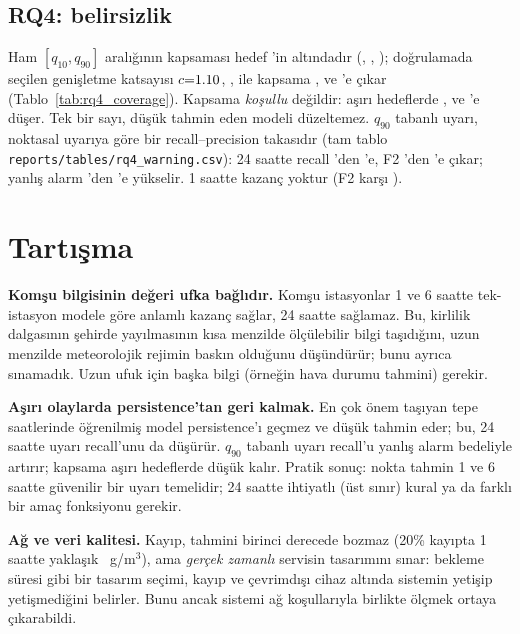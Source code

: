 \documentclass[conference]{IEEEtran}
\newcommand{\widetable}[1]{%
  \begingroup
  \renewenvironment{table}[1][]{\begin{table}[##1]}{\end{table}}%
  \endgroup}
\newcommand{\ugm}{\textmu g/m$^3$}
\begin{document}
\subsection{RQ4: belirsizlik}
Ham $[q_{10},q_{90}]$ aralığının kapsaması hedef \nTargetCoverage{}'in altındadır (\nCovRawHOne{}, \nCovRawHSix{}, \nCovRawHTwentyFour{}); doğrulamada seçilen genişletme katsayısı $c{=}1.10{}$, \nFactorHSix{}, \nFactorHTwentyFour{} ile kapsama \nCovCalHOne{}, \nCovCalHSix{} ve \nCovCalHTwentyFour{}'e çıkar (Tablo~\ref{tab:rq4_coverage}). Kapsama \emph{koşullu} değildir: aşırı hedeflerde \nCovExtCalHOne{}, \nCovExtCalHSix{} ve \nCovExtCalHTwentyFour{}'e düşer. Tek bir sayı, düşük tahmin eden modeli düzeltemez. $q_{90}$ tabanlı uyarı, noktasal uyarıya göre bir recall--precision takasıdır (tam tablo \texttt{reports/tables/rq4\_warning.csv}): 24 saatte recall \nQwRecMtwobHTwentyFour{}'den \nQwRecQnineHTwentyFour{}'e, F2 \nQwFtwoMtwobHTwentyFour{}'den \nQwFtwoQnineHTwentyFour{}'e çıkar; yanlış alarm \nQwFaMtwobHTwentyFour{}'den \nQwFaQnineHTwentyFour{}'e yükselir. 1 saatte kazanç yoktur (F2 \nQwFtwoQnineHOne{} karşı \nQwFtwoMtwobHOne{}).

\widetable{rq4_coverage}

\section{Tartışma}
\textbf{Komşu bilgisinin değeri ufka bağlıdır.} Komşu istasyonlar 1 ve 6 saatte tek-istasyon modele göre anlamlı kazanç sağlar, 24 saatte sağlamaz. Bu, kirlilik dalgasının şehirde yayılmasının kısa menzilde ölçülebilir bilgi taşıdığını, uzun menzilde meteorolojik rejimin baskın olduğunu düşündürür; bunu ayrıca sınamadık. Uzun ufuk için başka bilgi (örneğin hava durumu tahmini) gerekir.

\textbf{Aşırı olaylarda persistence'tan geri kalmak.} En çok önem taşıyan tepe saatlerinde öğrenilmiş model persistence'ı geçmez ve düşük tahmin eder; bu, 24 saatte uyarı recall'unu da düşürür. $q_{90}$ tabanlı uyarı recall'u yanlış alarm bedeliyle artırır; kapsama aşırı hedeflerde düşük kalır. Pratik sonuç: nokta tahmin 1 ve 6 saatte güvenilir bir uyarı temelidir; 24 saatte ihtiyatlı (üst sınır) kural ya da farklı bir amaç fonksiyonu gerekir.

\textbf{Ağ ve veri kalitesi.} Kayıp, tahmini birinci derecede bozmaz (20\% kayıpta 1 saatte yaklaşık \nDmgTwenty{}~\ugm{}), ama \emph{gerçek zamanlı} servisin tasarımını sınar: bekleme süresi gibi bir tasarım seçimi, kayıp ve çevrimdışı cihaz altında sistemin yetişip yetişmediğini belirler. Bunu ancak sistemi ağ koşullarıyla birlikte ölçmek ortaya çıkarabildi.
\end{document}
